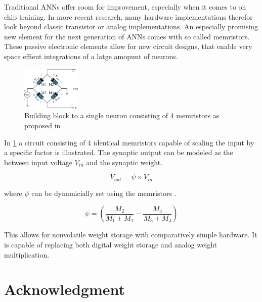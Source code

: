 \documentclass[conference]{IEEEtran}
\begin{document}
    Traditional ANNs offer room for improvement, especially when it comes to on chip training.
    In more recent research, many hardware implementations therefor look beyond classic transistor or analog implementations.
    An especially promising new element for the next generation of ANNs comes with so called memristors.
    These passive electronic elements allow for new circuit designs, that enable very space effient integrations of a latge amopunt of neurons.

    \begin{figure}[h]
        \centering
        \includegraphics[width=0.25\textwidth]{resources/memristor.png}
        \caption{Building block to a single neuron consisting of 4 memristors as proposed in \cite[Fig.~1]{adhikari2012memristor}}
        \label{fig:memristor}
    \end{figure}

    In \ref{fig:memristor} a circuit consisting of 4 identical memristors capable of scaling the input by a specific factor is illustrated.
    The synaptic output can be modeled as the between input voltage $V_{in}$ and the synaptic weight.

    \[V_{out} = \psi \times V_{in}\]

    where $\psi$ can be dynamicially set using the memristors \cite{adhikari2012memristor}.

    \[\psi = \left(\frac{M_2}{M_1+M_1} - \frac{M_4}{M_3+M_4}\right)\]

    This allows for nonvolatile weight storage with comparatively simple hardware.
    It is capable of replacing both digital weight storage and analog weight multiplication.


    \section*{Acknowledgment}



    \medskip

    
    
\end{document}
